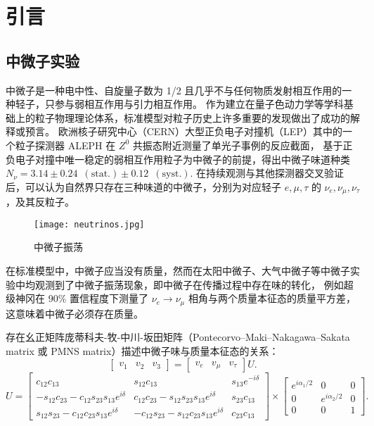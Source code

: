 
\chapter{引言}

\section{中微子实验}
中微子是一种电中性、自旋量子数为 1/2 且几乎不与任何物质发射相互作用的一种轻子，只参与弱相互作用与引力相互作用。
作为建立在量子色动力学等学科基础上的粒子物理理论体系，标准模型对粒子历史上许多重要的发现做出了成功的解释或预言。
欧洲核子研究中心（CERN）大型正负电子对撞机（LEP）其中的一个粒子探测器 ALEPH 在 $Z^0$ 共振态附近测量了单光子事例的反应截面\cite{DECAMP1989519}，
基于正负电子对撞中唯一稳定的弱相互作用粒子为中微子的前提，得出中微子味道种类 $N_\nu=3.14\pm0.24\enspace(\text{stat.})\pm0.12\enspace(\text{syst.})$.
在持续观测与其他探测器交叉验证后，可以认为自然界只存在三种味道的中微子，分别为对应轻子 $e,\mu,\tau$ 的 $\nu_e,\nu_\mu,\nu_\tau$，及其反粒子。

\begin{figure}
    \centering
    \texttt{[image: neutrinos.jpg]}
    \caption{中微子振荡}
\end{figure}

在标准模型中，中微子应当没有质量，然而在太阳中微子、大气中微子等中微子实验中均观测到了中微子振荡现象，即中微子在传播过程中存在味的转化，
例如超级神冈在 90\% 置信程度下测量了 $\nu_e\rightarrow\nu_\mu$ 相角与两个质量本征态的质量平方差\cite{fukudaEvidenceOscillationAtmospheric1998}，
这意味着中微子必须存在质量。

存在幺正矩阵庞蒂科夫-牧-中川-坂田矩阵（Pontecorvo–Maki–Nakagawa–Sakata matrix 或 PMNS matrix）描述中微子味与质量本征态的关系\cite{Cahn2009Aug}：
\begin{equation}
    \begin{bmatrix}
        v_1&v_2&v_3
    \end{bmatrix}
    =
    \begin{bmatrix}
        v_e&v_\mu&v_\tau
    \end{bmatrix}U.
\end{equation}
\begin{equation}\label{eq:PMNS}
    U=
    \begin{bmatrix}
    c_{12}c_{13}&s_{12}c_{13}&s_{13}e^{-i\delta}\\-s_{12}c_{23}-c_{12}s_{23}s_{13}e^{i\delta}&c_{12}c_{23}-s_{12}s_{23}s_{13}e^{i\delta}&s_{23}c_{13}\\s_{12}s_{23}-c_{12}c_{23}s_{13}e^{i\delta}&-c_{12}s_{23}-s_{12}c_{23}s_{13}e^{i\delta}&c_{23}c_{13}
    \end{bmatrix}
    \times 
    \begin{bmatrix}
    e^{i\alpha_1/2}&0&0\\0&e^{i\alpha_2/2}&0\\0&0&1
    \end{bmatrix}.
\end{equation}

